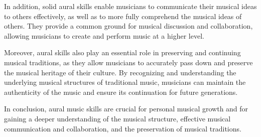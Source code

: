 In addition, solid aural skills enable musicians to communicate their musical ideas to others effectively, as well as to more fully comprehend the musical ideas of others. They provide a common ground for musical discussion and collaboration, allowing musicians to create and perform music at a higher level.

Moreover, aural skills also play an essential role in preserving and continuing musical traditions, as they allow musicians to accurately pass down and preserve the musical heritage of their culture. By recognizing and understanding the underlying musical structures of traditional music, musicians can maintain the authenticity of the music and ensure its continuation for future generations.

In conclusion, aural music skills are crucial for personal musical growth and for gaining a deeper understanding of the musical structure, effective musical communication and collaboration, and the preservation of musical traditions.






